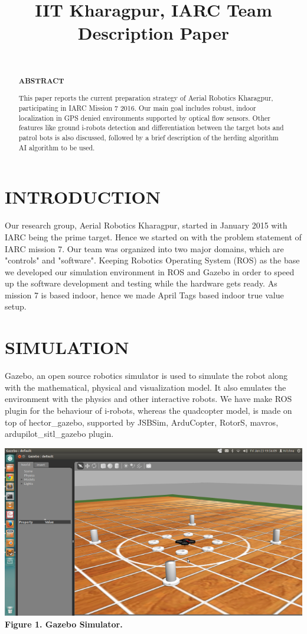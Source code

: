 \documentclass[12pt]{article}
\title{IIT Kharagpur, IARC Team Description Paper}
\begin{document}
\maketitle
\begin{abstract}
\\
\begin{center}\textbf{ABSTRACT}\end{center}
This paper reports the current preparation strategy of Aerial Robotics Kharagpur,
participating in IARC Mission 7 2016. Our main goal includes robust, indoor 
localization in GPS denied environments supported by optical flow sensors. 
Other features like ground i-robots detection and differentiation between the 
target bots and patrol bots is also discussed, followed by a brief description 
of the herding algorithm AI algorithm to be used.
\end{abstract}


\section{INTRODUCTION}
Our research group, Aerial Robotics Kharagpur, started in January 2015 with IARC 
being the prime target. Hence we started on with the problem statement of IARC 
mission 7. Our team was organized into two major domains, which are "controls" 
and "software". Keeping Robotics Operating System (ROS) as the base we developed 
our simulation environment in ROS and Gazebo in order to speed up the software 
development and testing while the hardware gets ready. As mission 7 is based 
indoor, hence we made April Tags based indoor true value setup.

\section{SIMULATION}
Gazebo, an open source robotics simulator is used to simulate the robot along with 
the mathematical, physical and visualization model. It also emulates the environment 
with the physics and other interactive robots. We have make ROS plugin for the behaviour 
of i-robots, whereas the quadcopter model,
is made on top of hector\_gazebo, supported by JSBSim, ArduCopter, RotorS, mavros,
ardupilot\_sitl\_gazebo plugin.

\begin{center}\includegraphics[scale=0.5]{image23} \\
\textbf{Figure 1. Gazebo Simulator.}\end{center}
\end{document}
